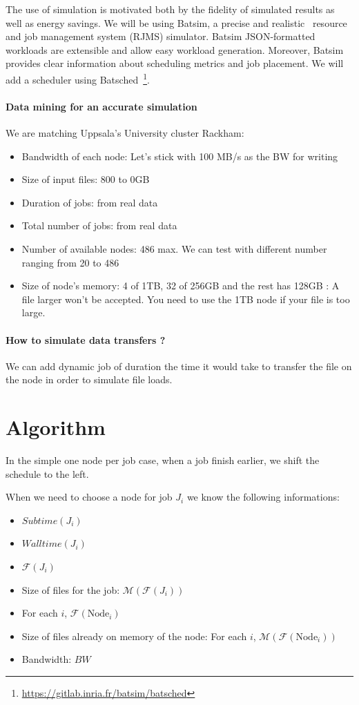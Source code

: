 \documentclass[a4paper]{article}
\newcommand{\Node}[1]{\ensuremath{\mathrm{Node}_{#1}}\xspace}
\newcommand{\inputs}{\ensuremath{\mathcal{F}}\xspace}
\newcommand{\memory}{\ensuremath{\mathcal{M}}\xspace}
\newcommand{\bandwidth}{\mathit{BW}\xspace}
\newcommand{\submissiontime}{\mathit{Subtime}\xspace}
\newcommand{\walltime}{\mathit{Walltime}\xspace}
\begin{document}
The use of simulation is motivated both by the fidelity of simulated results as well as energy savings. 
We will be using Batsim, a precise and realistic~\cite{Batsim} resource and job management system (RJMS) simulator.
Batsim JSON-formatted workloads are extensible and allow easy workload generation. 
Moreover, Batsim provides clear information about scheduling metrics and job placement.
We will add a scheduler using Batsched~\footnote{\url{https://gitlab.inria.fr/batsim/batsched}}.

\paragraph{Data mining for an accurate simulation}
We are matching Uppsala's University cluster Rackham:
\begin{itemize}
	\item	Bandwidth of each node: Let's stick with 100 MB/s as the BW for writing
	\item	Size of input files: 800 to 0GB
	\item	Duration of jobs: from real data
	\item	Total number of jobs: from real data
	\item	Number of available nodes: 486 max. We can test with different number ranging from 20 to 486
	\item	Size of node's memory: 4 of 1TB, 32 of 256GB and the rest has 128GB : A file larger won't be accepted. You need to use the 1TB node if your file is too large.
\end{itemize}

\paragraph{How to simulate data transfers ?}
We can add dynamic job of duration the time it would take to transfer the file on the node in order
to simulate file loads.

\section{Algorithm}

In the simple one node per job case, when a job finish earlier, we shift the schedule to the left.

When we need to choose a node for job $J_i$ we know the following informations:
\begin{itemize}
	\item $\submissiontime(J_i)$
	\item $\walltime(J_i)$
	\item $\inputs(J_i)$
	\item Size of files for the job: $\memory(\inputs(J_i))$
	\item For each $i$, $\inputs(\Node{i})$
	\item Size of files already on memory of the node: For each $i$, $\memory(\inputs(\Node{i}))$
	\item Bandwidth: $\bandwidth$
\end{itemize}
\end{document}
